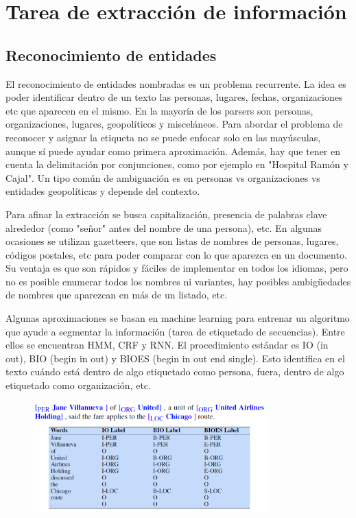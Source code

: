 \section{Tarea de extracción de información}
\subsection{Reconocimiento de entidades}
El reconocimiento de entidades nombradas es un problema recurrente. La idea es poder identificar dentro de un texto las personas, lugares, fechas, organizaciones etc que aparecen en el mismo. En la mayoría de los parsers son personas, organizaciones, lugares, geopolíticos y misceláneos. Para abordar el problema de reconocer y asignar la etiqueta no se puede enfocar solo en las mayúsculas, aunque sí puede ayudar como primera aproximación. Además, hay que tener en cuenta la delimitación por conjunciones, como por ejemplo en "Hospital Ramón y Cajal". Un tipo común de ambiguación es en personas vs organizaciones vs entidades geopolíticas y depende del contexto.

Para afinar la extracción se busca capitalización, presencia de palabras clave alrededor (como "señor" antes del nombre de una persona), etc. En algunas ocasiones se utilizan gazetteers, que son listas de nombres de personas, lugares, códigos postales, etc para poder comparar con lo que aparezca en un documento. Su ventaja es que son rápidos y fáciles de implementar en todos los idiomas, pero no es posible enumerar todos los nombres ni variantes, hay posibles ambigüedades de nombres que aparezcan en más de un listado, etc. 

Algunas aproximaciones se basan en machine learning para entrenar un algoritmo que ayude a segmentar la información (tarea de etiquetado de secuencias). Entre ellos se encuentran HMM, CRF y RNN. El procedimiento estándar es IO (in out), BIO (begin in out) y BIOES (begin in out end single). Esto identifica en el texto cuándo está dentro de algo etiquetado como persona, fuera, dentro de algo etiquetado como organización, etc. 

\begin{figure}[h]
\centering
\includegraphics[width = 0.8\textwidth]{figs/bioes.png}
\end{figure}

